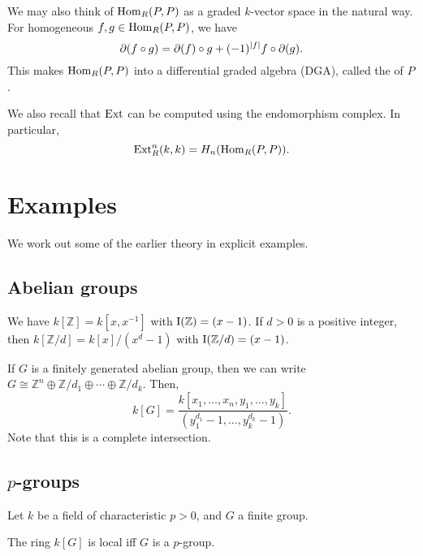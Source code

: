 \documentclass[12pt]{article}
\begin{document}
We may also think of $\operatorname{Hom}_{R}(P, P)$ as a graded $k$-vector space in the natural way. 
For homogeneous $f, g \in \operatorname{Hom}_{R}(P, P)$, we have
\begin{equation*} 
	\partial(f \circ g) = \partial(f) \circ g + (-1)^{{\left\lvert f \right\lvert}} f \circ \partial(g).
\end{equation*}
This makes $\operatorname{Hom}_{R}(P, P)$ into a differential graded algebra (DGA), 
called the  of $P$.

We also recall that $\operatorname{Ext}$ can be computed using the endomorphism complex. 
In particular,
\begin{equation*} 
	\operatorname{Ext}_{R}^{n}(k, k) = H_{n}(\operatorname{Hom}_{R}(P, P)).
\end{equation*}

\section{Examples}

We work out some of the earlier theory in explicit examples.

\subsection{Abelian groups}

We have $k[\mathbb{Z}] = k[x, x^{-1}]$ with $\operatorname{I}(\mathbb{Z}) = (x - 1)$. \newline
If $d > 0$ is a positive integer, then
$k[\mathbb{Z}/d] = k[x]/(x^{d} - 1)$ with $\operatorname{I}(\mathbb{Z}/d) = (x - 1)$.

If $G$ is a finitely generated abelian group, then we can write $G \cong \mathbb{Z}^{n} \oplus \mathbb{Z}/d_{1} \oplus \cdots \oplus \mathbb{Z}/d_{k}$. 
Then,
\begin{equation*} 
	k[G] = \frac{k[x_{1}, \ldots, x_{n}, y_{1}, \ldots, y_{k}]}{(y_{1}^{d_{1}} - 1, \ldots, y_{k}^{d_{k}} - 1)}.
\end{equation*}
Note that this is a complete intersection.

\subsection{\texorpdfstring{$p$}{p}-groups}

\begin{thm}
	Let $k$ be a field of characteristic $p > 0$, 
	and $G$ a finite group.

	The ring $k[G]$ is local iff $G$ is a $p$-group. 
\end{thm}
\end{document}
